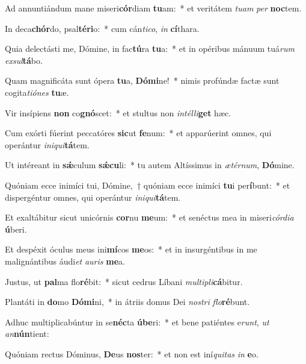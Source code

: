 \item Ad annuntiándum mane miseri\textbf{cór}diam \textbf{tu}am:~* et veritátem \textit{tu}\textit{am} \textit{per} \textbf{noc}tem.
\item In deca\textbf{chór}do, psal\textbf{té}\textbf{ri}o:~* cum cán\textit{ti}\textit{co}, \textit{in} \textbf{cí}thara.
\item Quia delectásti me, Dómine, in fac\textbf{tú}ra \textbf{tu}a:~* et in opéribus mánuum tuá\textit{rum} \textit{ex}\textit{sul}\textbf{tá}bo.
\item Quam magnificáta sunt ópera \textbf{tu}a, \textbf{Dó}\textbf{mi}ne!~* nimis profúndæ factæ sunt cogita\textit{ti}\textit{ó}\textit{nes} \textbf{tu}æ.
\item Vir insípiens \textbf{non} co\textbf{gnó}scet:~* et stultus non \textit{in}\textit{tél}\textit{li}\textbf{get} hæc.
\item Cum exórti fúerint peccatóres \textbf{sic}ut \textbf{fe}num:~* et apparúerint omnes, qui operántur \textit{in}\textit{i}\textit{qui}\textbf{tá}tem.
\item Ut intéreant in \textbf{sǽ}culum \textbf{sǽ}\textbf{cu}li:~* tu autem Altíssimus in \textit{æ}\textit{tér}\textit{num}, \textbf{Dó}mine.
\item Quóniam ecce inimíci tui, Dómine,~† quóniam ecce inimíci \textbf{tu}i per\textbf{í}bunt:~* et dispergéntur omnes, qui operántur \textit{in}\textit{i}\textit{qui}\textbf{tá}tem.
\item Et exaltábitur sicut unicórnis \textbf{cor}nu \textbf{me}um:~* et senéctus mea in miseri\textit{cór}\textit{di}\textit{a} \textbf{ú}beri.
\item Et despéxit óculus meus ini\textbf{mí}cos \textbf{me}os:~* et in insurgéntibus in me malignántibus áudi\textit{et} \textit{au}\textit{ris} \textbf{me}a.
\item Justus, ut \textbf{pal}ma flo\textbf{ré}bit:~* sicut cedrus Líbani \textit{mul}\textit{ti}\textit{pli}\textbf{cá}bitur.
\item Plantáti in \textbf{do}mo \textbf{Dó}\textbf{mi}ni,~* in átriis domus Dei \textit{nos}\textit{tri} \textit{flo}\textbf{ré}bunt.
\item Adhuc multiplicabúntur in se\textbf{néc}ta \textbf{ú}\textbf{be}ri:~* et bene patiéntes e\textit{runt}, \textit{ut} \textit{an}\textbf{nún}tient:
\item Quóniam rectus Dóminus, \textbf{De}us \textbf{nos}ter:~* et non est iní\textit{qui}\textit{tas} \textit{in} \textbf{e}o.
